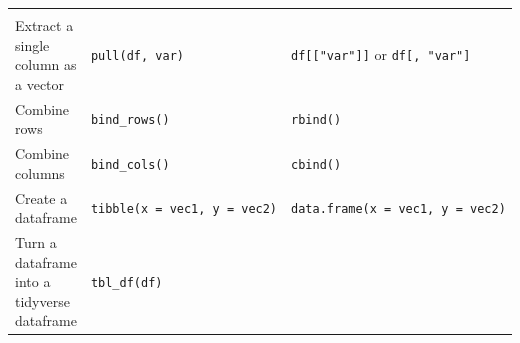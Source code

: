 \documentclass[
]{book}
\theoremstyle{definition}
\theoremstyle{definition}
\theoremstyle{definition}
\theoremstyle{remark}
\begin{document}
\begin{longtable}[]{@{}lll@{}}
\begin{minipage}[t]{0.30\columnwidth}
\end{minipage}\tabularnewline
\begin{minipage}[t]{0.29\columnwidth}\raggedright
Extract a single column as a vector\strut
\end{minipage} & \begin{minipage}[t]{0.33\columnwidth}\raggedright
\texttt{pull(df,\ var)}\strut
\end{minipage} & \begin{minipage}[t]{0.30\columnwidth}\raggedright
\texttt{df{[}{[}"var"{]}{]}} or \texttt{df{[},\ "var"{]}}\strut
\end{minipage}\tabularnewline
\begin{minipage}[t]{0.29\columnwidth}\raggedright
Combine rows\strut
\end{minipage} & \begin{minipage}[t]{0.33\columnwidth}\raggedright
\texttt{bind\_rows()}\strut
\end{minipage} & \begin{minipage}[t]{0.30\columnwidth}\raggedright
\texttt{rbind()}\strut
\end{minipage}\tabularnewline
\begin{minipage}[t]{0.29\columnwidth}\raggedright
Combine columns\strut
\end{minipage} & \begin{minipage}[t]{0.33\columnwidth}\raggedright
\texttt{bind\_cols()}\strut
\end{minipage} & \begin{minipage}[t]{0.30\columnwidth}\raggedright
\texttt{cbind()}\strut
\end{minipage}\tabularnewline
\begin{minipage}[t]{0.29\columnwidth}\raggedright
Create a dataframe\strut
\end{minipage} & \begin{minipage}[t]{0.33\columnwidth}\raggedright
\texttt{tibble(x\ =\ vec1,\ y\ =\ vec2)}\strut
\end{minipage} & \begin{minipage}[t]{0.30\columnwidth}\raggedright
\texttt{data.frame(x\ =\ vec1,\ y\ =\ vec2)}\strut
\end{minipage}\tabularnewline
\begin{minipage}[t]{0.29\columnwidth}\raggedright
Turn a dataframe into a tidyverse dataframe\strut
\end{minipage} & \begin{minipage}[t]{0.33\columnwidth}\raggedright
\texttt{tbl\_df(df)}\strut
\end{minipage} & \begin{minipage}[t]{0.30\columnwidth}\raggedright
\strut
\end{minipage}\tabularnewline
\bottomrule
\end{longtable}
\end{document}
